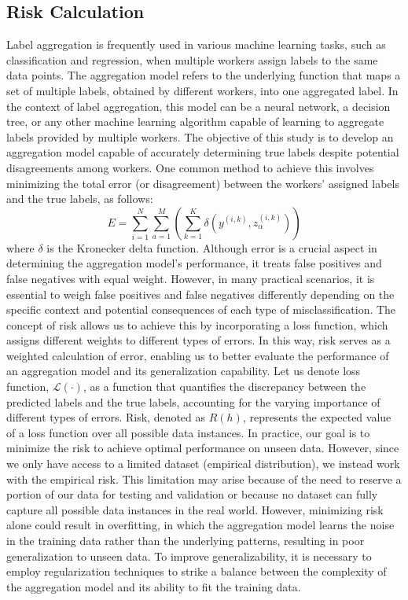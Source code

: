 \documentclass[default]{bst/sn-jnl_mine}%
\begin{document}
\subsection{Risk Calculation}
Label aggregation is frequently used in various machine learning tasks, such as classification and regression, when multiple workers assign labels to the same data points. The aggregation model refers to the underlying function that maps a set of multiple labels, obtained by different workers, into one aggregated label. In the context of label aggregation, this model can be a neural network, a decision tree, or any other machine learning algorithm capable of learning to aggregate labels provided by multiple workers. The objective of this study is to develop an aggregation model capable of accurately determining true labels despite potential disagreements among workers. One common method to achieve this involves minimizing the total error (or disagreement) between the workers' assigned labels and the true labels, as follows:
\begin{equation}
    E = \sum_{i=1}^N \sum_{a=1}^M \left( \sum_{k=1}^K \delta\left(y^{(i,k)}, z_\alpha^{(i,k)}\right) \right)
    \label{eq:crowd.Eq.1.risk.error}
\end{equation}
where $\delta $ is the Kronecker delta function.
Although error is a crucial aspect in determining the aggregation model's performance, it treats false positives and false negatives with equal weight. However, in many practical scenarios, it is essential to weigh false positives and false negatives differently depending on the specific context and potential consequences of each type of misclassification. The concept of risk allows us to achieve this by incorporating a loss function, which assigns different weights to different types of errors. In this way, risk serves as a weighted calculation of error, enabling us to better evaluate the performance of an aggregation model and its generalization capability.
Let us denote loss function, $\mathcal{L}(\cdot)$, as a function that quantifies the discrepancy between the predicted labels and the true labels, accounting for the varying importance of different types of errors. Risk, denoted as $R(h) $, represents the expected value of a loss function over all possible data instances.  In practice, our goal is to minimize the risk to achieve optimal performance on unseen data. However, since we only have access to a limited dataset (empirical distribution), we instead work with the empirical risk. This limitation may arise because of the need to reserve a portion of our data for testing and validation or because no dataset can fully capture all possible data instances in the real world. However, minimizing risk alone could result in overfitting, in which the aggregation model learns the noise in the training data rather than the underlying patterns, resulting in poor generalization to unseen data. To improve generalizability, it is necessary to employ regularization techniques to strike a balance between the complexity of the aggregation model and its ability to fit the training data.
\end{document}
